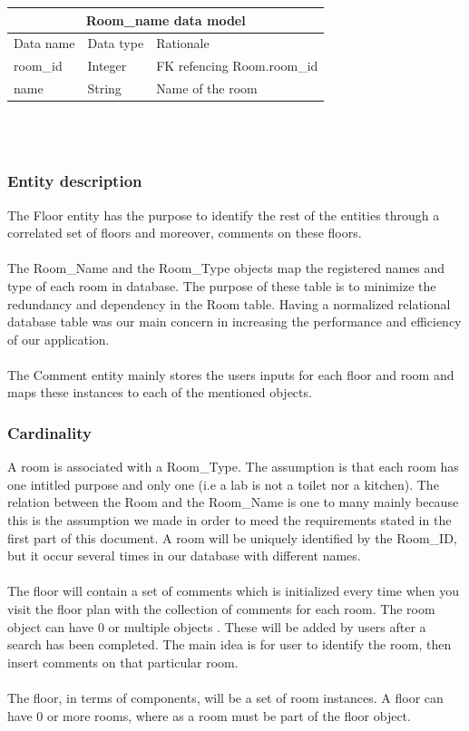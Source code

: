 \documentclass{sig-alt-release2}
\begin{document}
\begin{tabular}{| p{1.8cm} | p{1cm} | p{4.2cm}|}
\hline
\multicolumn{3}{|c|}{\textbf{Room\_name data model}} \\
\hline
Data name & Data type & Rationale \\
\hline
room\_id & Integer & FK refencing Room.room\_id \\
\hline
name & String & Name of the room \\
\hline
\end{tabular}	
\\
\\
\subsubsection{Entity description}
The Floor entity has the purpose to identify the rest of the entities through 
a correlated set of floors and moreover, comments on these floors.\\
\\
The Room\_Name and the Room\_Type objects map the registered names and type 
of each room in database. The purpose of these table is to minimize the 
redundancy and dependency in the Room table. Having a normalized relational 
database table was our main concern in increasing the performance and efficiency 
of our application.\\
\\
The Comment entity mainly stores the users inputs for each floor and room and 
maps these instances to each of the mentioned objects.


\subsubsection{Cardinality}
A room is associated with a Room\_Type. The assumption is that each room
has one intitled purpose and only one (i.e a lab is not a toilet nor a kitchen).
The relation between the Room and the Room\_Name is one to many mainly 
because this is the assumption we made in order to meed the requirements
stated in the first part of this document. A room will be uniquely identified 
by the Room\_ID, but it occur several times in our database with different 
names.\\
\\
The floor will contain a set of comments which is initialized every time when 
you visit the floor plan with the collection of comments for each room. The 
room object can have 0 or multiple objects . These will be added by users after 
a search has been completed. The main idea is for user to identify the room, 
then insert comments on that particular room.\\
\\
The floor, in terms of components, will be a set of room instances. A floor 
can have 0 or more rooms, where as a room must be part of the floor object.\\
\end{document}
